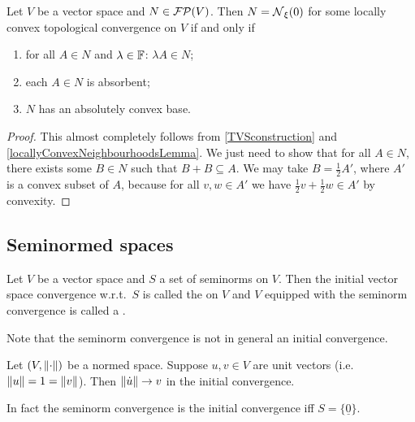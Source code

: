 \begin{proposition} \label{LCTVSconstruction}
Let $V$ be a vector space and $N\in\operatorname{\mathcal{FP}}(V)$. Then $N = \operatorname{\mathcal{N}}_\xi(0)$ for some locally convex topological convergence on $V$ \textup{if and only if}
\begin{enumerate}
\item for all $A\in N$ and $\lambda\in \mathbb{F}$: $\lambda A\in N$;
\item each $A \in N$ is absorbent;
\item $N$ has an absolutely convex base.
\end{enumerate}
\end{proposition}
\begin{proof}
This almost completely follows from \ref{TVSconstruction} and \ref{locallyConvexNeighbourhoodsLemma}. We just need to show that for all $A\in N$, there exists some $B\in N$ such that $B+B\subseteq A$. We may take $B = \frac{1}{2}A'$, where $A'$ is a convex subset of $A$, because for all $v,w\in A'$ we have $\frac{1}{2}v + \frac{1}{2}w \in A'$ by convexity.
\end{proof}

\subsection{Seminormed spaces}
\begin{definition}
Let $V$ be a vector space and $S$ a set of seminorms on $V$. 
Then the initial vector space convergence w.r.t.\ $S$ is called the  on $V$ and $V$ equipped with the seminorm convergence is called a .
\end{definition}
Note that the seminorm convergence is not in general an initial convergence.
\begin{example}
Let $\sSet{V, \norm{\cdot}}$ be a normed space. Suppose $u,v\in V$ are unit vectors (i.e.\ $\lVert u\rVert = 1 = \lVert v\rVert$). Then $\lVert\dot{u}\rVert \to v$ in the initial convergence.
\end{example}

In fact the seminorm convergence is the initial convergence iff $S = \{\underline{0}\}$.

